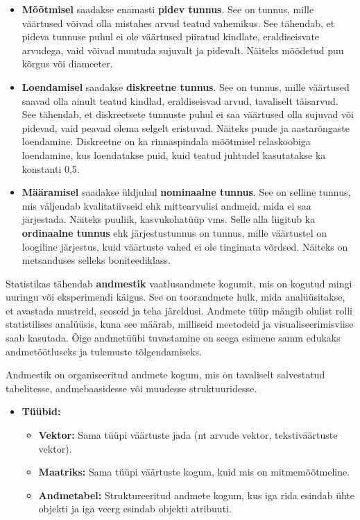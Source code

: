 \documentclass[
]{book}
\providecommand{\tightlist}{%
  \setlength{\itemsep}{0pt}\setlength{\parskip}{0pt}}
\begin{document}
\begin{itemize}
\tightlist
\item
  \textbf{Mõõtmisel} saadakse enamasti \textbf{pidev tunnus}. See on tunnus, mille väärtused võivad olla mistahes arvud teatud vahemikus. See tähendab, et pideva tunnuse puhul ei ole väärtused piiratud kindlate, eraldiseisvate arvudega, vaid võivad muutuda sujuvalt ja pidevalt. Näiteks mõõdetud puu kõrgus või diameeter.
\item
  \textbf{Loendamisel} saadakse \textbf{diskreetne tunnus}. See on tunnus, mille väärtused saavad olla ainult teatud kindlad, eraldiseisvad arvud, tavaliselt täisarvud. See tähendab, et diskreetsete tunnuste puhul ei saa väärtused olla sujuvad või pidevad, vaid peavad olema selgelt eristuvad. Näiteks puude ja aastarõngaste loendamine. Diskreetne on ka rinnaspindala mõõtmisel relaskoobiga loendamine, kus loendatakse puid, kuid teatud juhtudel kasutatakse ka konstanti 0,5.
\item
  \textbf{Määramisel} saadakse üldjuhul \textbf{nominaalne tunnus}. See on selline tunnus, mis väljendab kvalitatiivseid ehk mittearvulisi andmeid, mida ei saa järjestada. Näiteks puuliik, kasvukohatüüp vms. Selle alla liigitub ka \textbf{ordinaalne tunnus} ehk järjestustunnus on tunnus, mille väärtustel on loogiline järjestus, kuid väärtuste vahed ei ole tingimata võrdsed. Näiteks on metsanduses selleks boniteediklass.
\end{itemize}

Statistikas tähendab \textbf{andmestik} vaatlusandmete kogumit, mis on kogutud mingi uuringu või eksperimendi käigus. See on toorandmete hulk, mida analüüsitakse, et avastada mustreid, seoseid ja teha järeldusi. Andmete tüüp mängib olulist rolli statistilises analüüsis, kuna see määrab, milliseid meetodeid ja visualiseerimisviise saab kasutada. Õige andmetüübi tuvastamine on seega esimene samm edukaks andmetöötluseks ja tulemuste tõlgendamiseks.

Andmestik on organiseeritud andmete kogum, mis on tavaliselt salvestatud tabelitesse, andmebaasidesse või muudesse struktuuridesse.

\begin{itemize}
\tightlist
\item
  \textbf{Tüübid:}

  \begin{itemize}
  \tightlist
  \item
    \textbf{Vektor:} Sama tüüpi väärtuste jada (nt arvude vektor, tekstiväärtuste vektor).
  \item
    \textbf{Maatriks:} Sama tüüpi väärtuste kogum, kuid mis on mitmemõõtmeline.
  \item
    \textbf{Andmetabel:} Struktureeritud andmete kogum, kus iga rida esindab ühte objekti ja iga veerg esindab objekti atribuuti.
  \end{itemize}
\end{itemize}
\end{document}
